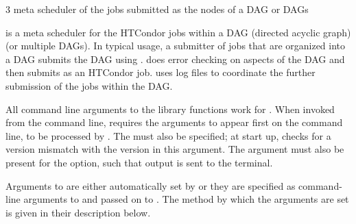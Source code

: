 \begin{ManPage}{\label{man-condor-dagman}}{3}
{meta scheduler of the jobs submitted as the nodes of a DAG or DAGs}

\Synopsis 
{}



\Description
{} is a meta scheduler for the HTCondor jobs within
a DAG (directed acyclic graph) (or multiple DAGs).
In typical usage,
a submitter of jobs that are organized into a DAG submits the
DAG using .
 does error checking on aspects of the DAG
and then submits  as an HTCondor job.
 uses log files to coordinate the further 
submission of the jobs within the DAG.

All command line arguments to the  library functions
work for .
When invoked from the command line,  requires
the arguments  to appear first on the command line,
to be processed by .
The  must also be specified;
at start up,
 checks for a version mismatch with the
 version in this argument.
The  argument must also be present for the 
option, such that output is sent to the terminal.

Arguments to  are either automatically set
by  
or they are specified as command-line arguments to 
and passed on to .
The method by which the arguments are set is
given in their description below.


\end{ManPage}
